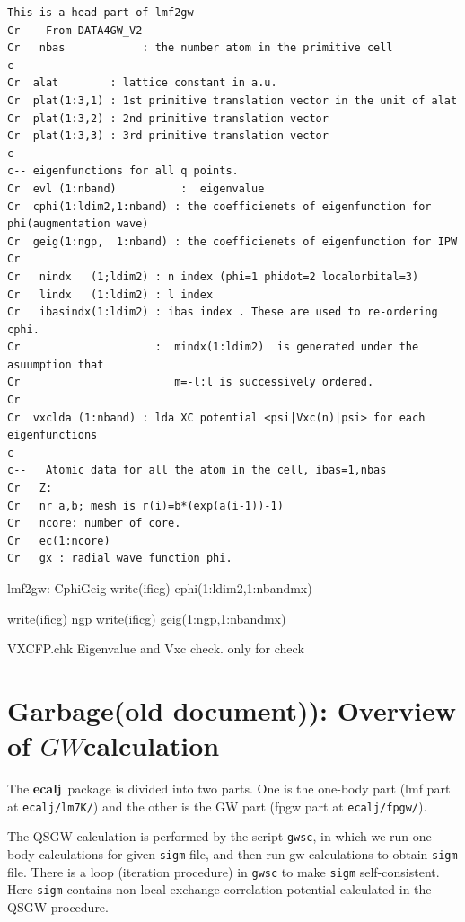 \documentclass[a4paper,10pt,epsf,fleqn]{article}
\newcommand{\GW}{$GW$}
\newcommand{\io}[1]{{\sf  #1}}
\newcommand{\ecalj}{{\bf ecalj}\ }
\begin{document}
\begin{verbatim}
This is a head part of lmf2gw
Cr--- From DATA4GW_V2 -----
Cr   nbas            : the number atom in the primitive cell
c
Cr  alat        : lattice constant in a.u.
Cr  plat(1:3,1) : 1st primitive translation vector in the unit of alat
Cr  plat(1:3,2) : 2nd primitive translation vector
Cr  plat(1:3,3) : 3rd primitive translation vector
c
c-- eigenfunctions for all q points.
Cr  evl (1:nband)          :  eigenvalue
Cr  cphi(1:ldim2,1:nband) : the coefficienets of eigenfunction for phi(augmentation wave)
Cr  geig(1:ngp,  1:nband) : the coefficienets of eigenfunction for IPW
Cr
Cr   nindx   (1;ldim2) : n index (phi=1 phidot=2 localorbital=3)
Cr   lindx   (1:ldim2) : l index
Cr   ibasindx(1:ldim2) : ibas index . These are used to re-ordering cphi.
Cr                     :  mindx(1:ldim2)  is generated under the asuumption that
Cr                        m=-l:l is successively ordered.
Cr
Cr  vxclda (1:nband) : lda XC potential <psi|Vxc(n)|psi> for each eigenfunctions
c
c--   Atomic data for all the atom in the cell, ibas=1,nbas
Cr   Z:
Cr   nr a,b; mesh is r(i)=b*(exp(a(i-1))-1)
Cr   ncore: number of core.
Cr   ec(1:ncore)
Cr   gx : radial wave function phi.
\end{verbatim}

lmf2gw:
\io{CphiGeig}
          write(ificg) cphi(1:ldim2,1:nbandmx)

          write(ificg) ngp
          write(ificg) geig(1:ngp,1:nbandmx)

\io{VXCFP.chk} Eigenvalue and Vxc check. only for check\\

\newpage
\section{Garbage(old document)): Overview of \GW calculation}

The \ecalj package is divided into two parts.
One is the one-body part (lmf part at \verb#ecalj/lm7K/#) 
and the other is the GW part (fpgw part at \verb#ecalj/fpgw/#). 

The QSGW calculation is performed by the script \verb#gwsc#, in which
we run one-body calculations for given \verb#sigm# file, and then
run gw calculations to obtain \verb#sigm# file.
There is a loop (iteration procedure) in \verb#gwsc# to make 
\verb#sigm# self-consistent. 
Here \verb#sigm# contains non-local exchange correlation potential
calculated in the QSGW procedure.
\end{document}
